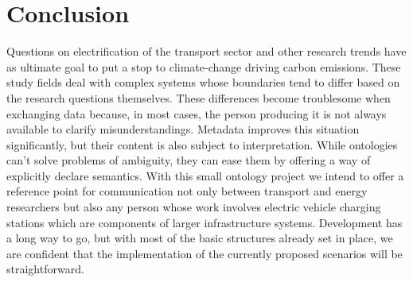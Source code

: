 ﻿\section{Conclusion}
\label{conclusion}

Questions on electrification of the transport sector and other research trends
have as ultimate goal to put a stop to climate-change driving carbon emissions.
These study fields deal with complex systems whose boundaries tend to differ
based on the research questions themselves. These differences become
troublesome when exchanging data because, in most cases, the person producing
it is not always available to clarify misunderstandings. Metadata improves this
situation significantly, but their content is also subject to interpretation.
While ontologies can't solve problems of ambiguity, they can ease them by
offering a way of explicitly declare semantics. With this small ontology
project we intend to offer a reference point for communication not only between
transport and energy researchers but also any person whose work involves
electric vehicle charging stations which are components of larger
infrastructure systems. Development has a long way to go, but with most of the
basic structures already set in place, we are confident that the implementation
of the currently proposed scenarios will be straightforward.